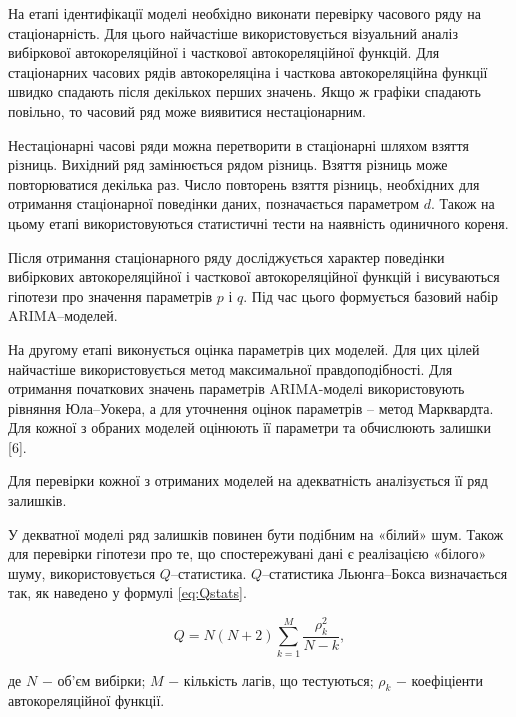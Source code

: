 На етапі ідентифікації моделі необхідно виконати перевірку часового ряду на стаціонарність. Для цього найчастіше використовується візуальний аналіз вибіркової автокореляційної і часткової автокореляційної функцій. Для стаціонарних часових рядів автокореляціна і часткова автокореляційна функції швидко спадають після декількох перших значень. Якщо ж графіки спадають повільно, то часовий ряд може виявитися нестаціонарним. 

Нестаціонарні часові ряди можна перетворити в стаціонарні шляхом взяття різниць. Вихідний ряд замінюється рядом різниць. Взяття різниць може повторюватися декілька раз. Число повторень взяття різниць, необхідних для отримання стаціонарної поведінки даних, позначається параметром $d$. Також на цьому етапі використовуються статистичні тести на наявність одиничного кореня.

Після отримання стаціонарного ряду досліджується характер поведінки вибіркових автокореляційної і часткової автокореляційної функцій і висуваються гіпотези про значення параметрів $p$ і $q$. Під час цього формується базовий набір ARIMA–моделей.

На другому етапі виконується оцінка параметрів цих моделей. Для цих цілей найчастіше використовується метод максимальної правдоподібності. Для отримання початкових значень параметрів ARIMA-моделі використовують рівняння Юла–Уокера, а для уточнення оцінок параметрів – метод Марквардта. Для кожної з обраних моделей оцінюють її параметри та обчислюють залишки [6]. 

Для перевірки кожної з отриманих моделей на адекватність аналізується її ряд залишків. 

У декватної моделі ряд залишків повинен бути подібним на «білий» шум. Також для перевірки гіпотези про те, що спостережувані дані є реалізацією «білого» шуму, використовується $Q$–статистика. $Q$–статистика Льюнга–Бокса визначається так, як наведено у формулі \ref{eq:Qstats}.

\begin{equation}\label{eq:Qstats}
Q = N(N+2)\sum_{k=1}^{M}\frac{\rho_{k}^{2}}{N-k},
\end{equation}

\noindent де $N$ $-$ об’єм вибірки; \newline
\hspace*{15pt}$M$ $-$ кількість лагів, що тестуються; \newline
\hspace*{15pt}$\rho_{k}$ $-$ коефіціенти автокореляційної функції. 


